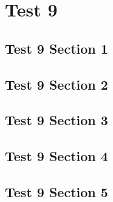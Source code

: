 \chapter{Test 9}
\localtableofcontents
\clearpage

\section{Test 9 Section 1}

\linebreak

\section{Test 9 Section 2}

\linebreak

\section{Test 9 Section 3}

\linebreak

\section{Test 9 Section 4}

\linebreak

\section{Test 9 Section 5}

\linebreak